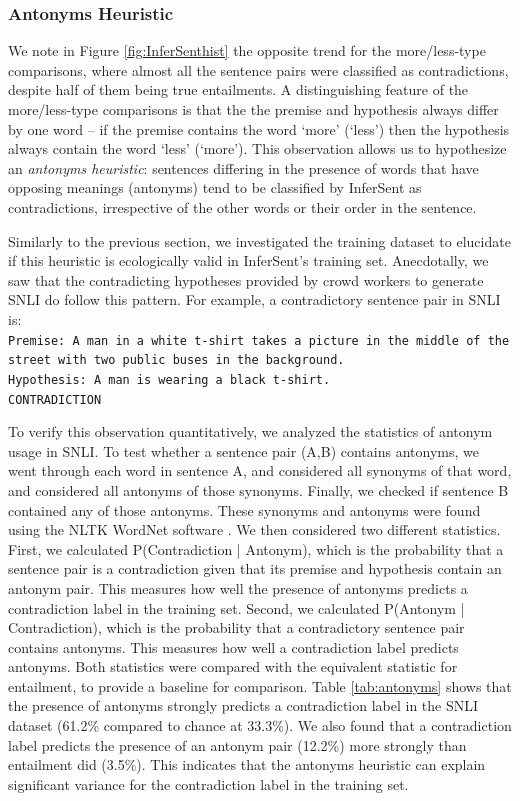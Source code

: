 \subsubsection{Antonyms Heuristic}
We note in Figure \ref{fig:InferSenthist} the opposite trend for the more/less-type comparisons, where almost all the sentence pairs were classified as contradictions, despite half of them being true entailments. A distinguishing feature of the more/less-type comparisons is that the the premise and hypothesis always differ by one word -- if the premise contains the word `more' (`less') then the hypothesis always contain the word `less' (`more'). This observation allows us to hypothesize an \emph{antonyms heuristic}: sentences differing in the presence of words that have opposing meanings (antonyms) tend to be classified by InferSent as contradictions, irrespective of the other words or their order in the sentence.

Similarly to the previous section, we investigated the training dataset to elucidate if this heuristic is ecologically valid in InferSent's training set. Anecdotally, we saw that the contradicting hypotheses provided by crowd workers to generate SNLI do follow this pattern. For example, a contradictory sentence pair in SNLI is:\\
{\tt Premise: A man in a white t-shirt takes a picture in the middle of the street with two public buses in the background. \\ Hypothesis:  A man is wearing a black t-shirt. \\ CONTRADICTION\\}

To verify this observation quantitatively, we analyzed the statistics of antonym usage in SNLI. To test whether a sentence pair (A,B) contains antonyms, we went through each word in sentence A, and considered all synonyms of that word, and considered all antonyms of those synonyms. Finally, we checked if sentence B contained any of those antonyms. These synonyms and antonyms were found using the NLTK WordNet software \citep{bird2004nltk}. We then considered two different statistics. First, we calculated P(Contradiction | Antonym), which is the probability that a sentence pair is a contradiction given that its premise and hypothesis contain an antonym pair. This measures how well the presence of antonyms predicts a contradiction label in the training set. Second, we calculated P(Antonym | Contradiction), which is the probability that a contradictory sentence pair contains antonyms. This measures how well a contradiction label predicts antonyms. Both statistics were compared with the equivalent statistic for entailment, to provide a baseline for comparison. Table \ref{tab:antonyms} shows that the presence of antonyms strongly predicts a contradiction label in the SNLI dataset (61.2\% compared to chance at 33.3\%). We also found that a contradiction label predicts the presence of an antonym pair (12.2\%) more strongly than entailment did (3.5\%). This indicates that the antonyms heuristic can explain significant variance for the contradiction label in the training set.

